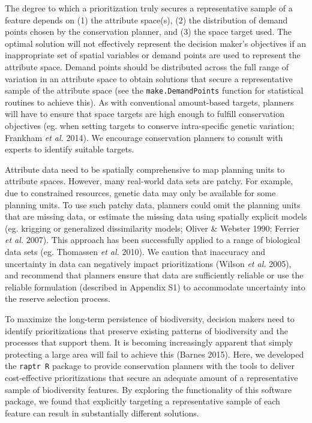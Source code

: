The degree to which a prioritization truly secures a representative
sample of a feature depends on (1) the attribute space(s), (2) the
distribution of demand points chosen by the conservation planner, and
(3) the space target used. The optimal solution will not effectively
represent the decision maker's objectives if an inappropriate set of
spatial variables or demand points are used to represent the attribute
space. Demand points should be distributed across the full range of
variation in an attribute space to obtain solutions that secure a
representative sample of the attribute space (see the
\texttt{make.DemandPoints} function for statistical routines to achieve
this). As with conventional amount-based targets, planners will have to
ensure that space targets are high enough to fulfill conservation
objectives (eg. when setting targets to conserve intra-specific genetic
variation; Frankham \emph{et al.} 2014). We encourage conservation
planners to consult with experts to identify suitable targets.

Attribute data need to be spatially comprehensive to map planning units
to attribute spaces. However, many real-world data sets are patchy. For
example, due to constrained resources, genetic data may only be
available for some planning units. To use such patchy data, planners
could omit the planning units that are missing data, or estimate the
missing data using spatially explicit models (eg. krigging or
generalized dissimilarity models; Oliver \& Webster 1990; Ferrier
\emph{et al.} 2007). This approach has been successfully applied to a
range of biological data sets (eg. Thomassen \emph{et al.} 2010). We
caution that inaccuracy and uncertainty in data can negatively impact
prioritizations (Wilson \emph{et al.} 2005), and recommend that planners
ensure that data are sufficiently reliable or use the reliable
formulation (described in Appendix S1) to accommodate uncertainty into
the reserve selection process.

To maximize the long-term persistence of biodiversity, decision makers
need to identify prioritizations that preserve existing patterns of
biodiversity and the processes that support them. It is becoming
increasingly apparent that simply protecting a large area will fail to
achieve this (Barnes 2015). Here, we developed the \texttt{raptr R}
package to provide conservation planners with the tools to deliver
cost-effective prioritizations that secure an adequate amount of a
representative sample of biodiversity features. By exploring the
functionality of this software package, we found that explicitly
targeting a representative sample of each feature can result in
substantially different solutions.

